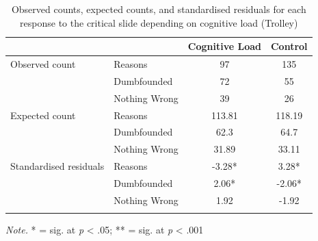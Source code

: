 \documentclass[
  man,floatsintext]{apa6}
\begin{document}
\begin{table}[tbp]

\begin{center}
\begin{threeparttable}

\caption{\label{tab:tabS6tab1dumbTrolley}Observed counts, expected counts, and standardised residuals for each response to the critical slide depending on cognitive load (Trolley)}

\begin{tabular}{llcc}
\toprule
 & \multicolumn{1}{c}{} & \multicolumn{1}{c}{Cognitive Load} & \multicolumn{1}{c}{Control}\\
\midrule
Observed count & Reasons & 97 & 135\\
 & Dumbfounded & 72 & 55\\
 & Nothing Wrong & 39 & 26\\
Expected count & Reasons & 113.81 & 118.19\\
 & Dumbfounded & 62.3 & 64.7\\
 & Nothing Wrong & 31.89 & 33.11\\
Standardised residuals & Reasons & -3.28* & 3.28*\\
 & Dumbfounded & 2.06* & -2.06*\\
 & Nothing Wrong & 1.92 & -1.92\\
\bottomrule
\addlinespace
\end{tabular}

\begin{tablenotes}[para]
\normalsize{\textit{Note.} * = sig. at \emph{p} < .05; ** = sig. at \emph{p} < .001}
\end{tablenotes}

\end{threeparttable}
\end{center}

\end{table}
\end{document}
